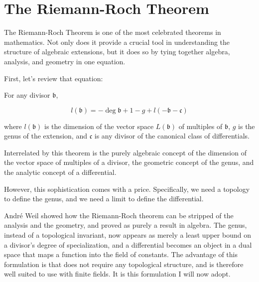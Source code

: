 \section{The Riemann-Roch Theorem}

The Riemann-Roch Theorem is one of the most celebrated theorems in
mathematics.  Not only does it provide a crucial tool in understanding
the structure of algebraic extensions, but it does so by tying
together algebra, analysis, and geometry in one equation.

First, let's review that equation:


% 
% 

For any divisor $\mathfrak{b}$,


$$l(\mathfrak{b}) = - \deg \mathfrak{b} + 1 - g + l(-\mathfrak{b}-\mathfrak{c}) $$

where $l(\mathfrak{b})$ is the dimension of the vector space
$L(\mathfrak{b})$ of multiples of $\mathfrak{b}$, $g$ is the genus of
the extension, and $\mathfrak{c}$ is any divisor of the canonical class of
differentials.

\endtheorem

Interrelated by this theorem is the purely algebraic concept of the
dimension of the vector space of multiples of a divisor, the geometric
concept of the genus, and the analytic concept of a differential.

However, this sophistication comes with a price.  Specifically, we
need a topology to define the genus, and we need a limit to define the
differential.

Andr\'e Weil showed how the Riemann-Roch theorem can be stripped of
the analysis and the geometry, and proved as purely a result in
algebra.  The genus, instead of a topological invariant, now appears
as merely a least upper bound on a divisor's degree of specialization,
and a differential becomes an object in a dual space that maps a
function into the field of constants.  The advantage of this
formulation is that does not require any topological structure, and is
therefore well suited to use with finite fields.  It is this
formulation I will now adopt.

